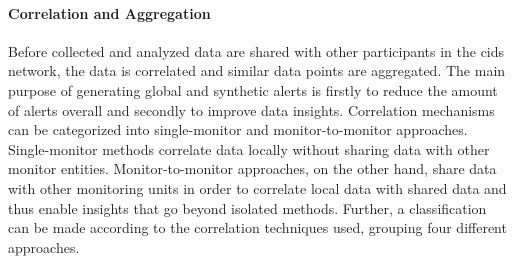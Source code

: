 \paragraph{Correlation and Aggregation}\label{par:correlation_and_aggregation} Before collected and analyzed data are shared with other participants in the \acrshort{cids} network, the data is correlated and similar data points are aggregated. The main purpose of generating global and synthetic alerts is firstly to reduce the amount of alerts overall and secondly to improve data insights. Correlation mechanisms can be categorized into single-monitor and monitor-to-monitor approaches. Single-monitor methods correlate data locally without sharing data with other monitor entities. Monitor-to-monitor approaches, on the other hand, share data with other monitoring units in order to correlate local data with shared data and thus enable insights that go beyond isolated methods. Further, a classification can be made according to the correlation techniques used, grouping four different approaches.
